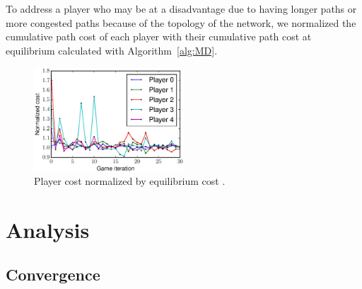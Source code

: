 \documentclass{sig-alternate-ipsn13}
\begin{document}



To address a player who may be at a disadvantage due to having longer paths or more congested paths because of the topology of the network, we normalized the cumulative path cost of each player with their cumulative path cost at equilibrium calculated with Algorithm~\ref{alg:MD}.

\begin{figure}[h]
  \centering
  \includegraphics[width=0.5\textwidth]{images/players_costs}
  \caption{Player cost normalized by equilibrium cost .}
  \label{fig:normalized_costs}
\end{figure}

\section{Analysis}
\label{sec:analysis}

\subsection{Convergence}
\end{document}
